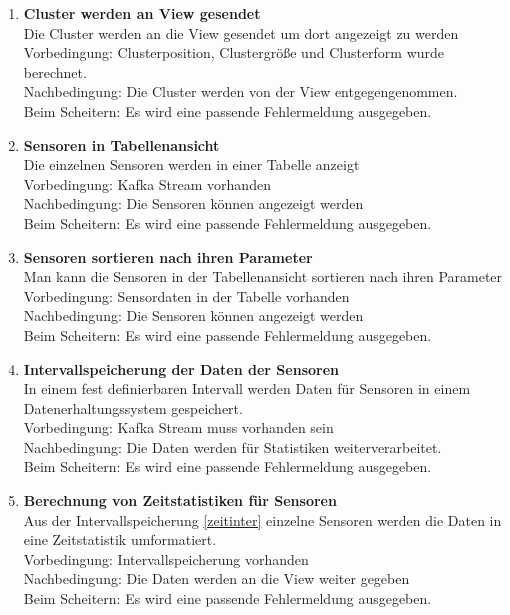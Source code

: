\begin{enumerate}[label=\textbf{PF\arabic{enumi}0}]
	\item \textbf{Cluster werden an View gesendet } \label{send}\\
		Die Cluster werden an die View gesendet um dort angezeigt zu werden \\
		Vorbedingung: Clusterposition, Clustergröße und Clusterform wurde berechnet.\\
		Nachbedingung: Die Cluster werden von der View entgegengenommen.  \\ 
		Beim Scheitern: Es wird eine passende Fehlermeldung ausgegeben.
		
	\item \textbf{Sensoren in Tabellenansicht} \\
		Die einzelnen Sensoren werden in einer Tabelle anzeigt  \\
		Vorbedingung: Kafka Stream vorhanden\\
		Nachbedingung: Die Sensoren können angezeigt werden \\ 
		Beim Scheitern: Es wird eine passende Fehlermeldung ausgegeben.
	
		\item \textbf{Sensoren sortieren nach ihren Parameter} \\
		Man kann die Sensoren in der Tabellenansicht sortieren nach ihren Parameter\\
		Vorbedingung: Sensordaten in der Tabelle vorhanden\\
		Nachbedingung: Die Sensoren können angezeigt werden \\ 
		Beim Scheitern: Es wird eine passende Fehlermeldung ausgegeben.
		
	\item \textbf{Intervallspeicherung der Daten der Sensoren} \label{zeitinter}\\
		In einem fest definierbaren Intervall werden Daten für Sensoren in einem Datenerhaltungssystem gespeichert.  \\
		Vorbedingung: Kafka Stream muss vorhanden sein\\
		Nachbedingung: Die Daten werden für Statistiken weiterverarbeitet.  \\ 
		Beim Scheitern: Es wird eine passende Fehlermeldung ausgegeben.
	
	\item \textbf{Berechnung von Zeitstatistiken für Sensoren } \label{single}\\
		Aus der Intervallspeicherung \ref{zeitinter} einzelne Sensoren werden die Daten in eine Zeitstatistik umformatiert.\\
		Vorbedingung: Intervallspeicherung vorhanden\\
		Nachbedingung: Die Daten werden an die View weiter gegeben  \\ 
		Beim Scheitern: Es wird eine passende Fehlermeldung ausgegeben.
	

\end{enumerate}
